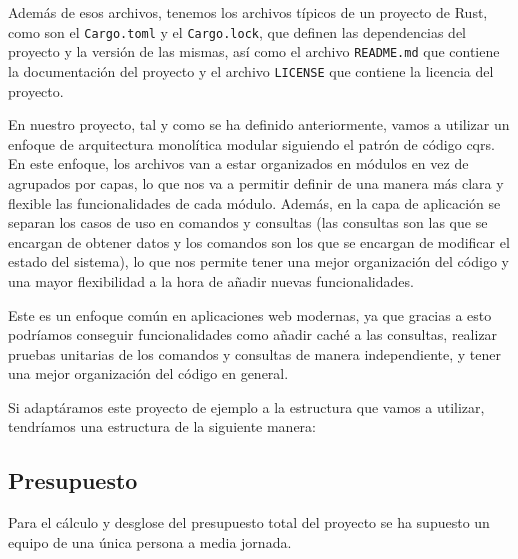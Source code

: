 Además de esos archivos, tenemos los archivos típicos de un proyecto de Rust, como son el \texttt{Cargo.toml} y el \texttt{Cargo.lock}, que definen las dependencias del proyecto y la versión de las mismas, así como el archivo \texttt{README.md} que contiene la documentación del proyecto y el archivo \texttt{LICENSE} que contiene la licencia del proyecto.

En nuestro proyecto, tal y como se ha definido anteriormente, vamos a utilizar un enfoque de arquitectura monolítica modular siguiendo el patrón de código \acrshort{cqrs}.
En este enfoque, los archivos van a estar organizados en módulos en vez de agrupados por capas, lo que nos va a permitir definir de una manera más clara y flexible las funcionalidades de cada módulo.
Además, en la capa de aplicación se separan los casos de uso en comandos y consultas (las consultas son las que se encargan de obtener datos y los comandos son los que se encargan de modificar el estado del sistema), lo que nos permite tener una mejor organización del código y una mayor flexibilidad a la hora de añadir nuevas funcionalidades.

Este es un enfoque común en aplicaciones web modernas, ya que gracias a esto podríamos conseguir funcionalidades como añadir caché a las consultas, realizar pruebas unitarias de los comandos y consultas de manera independiente, y tener una mejor organización del código en general.

Si adaptáramos este proyecto de ejemplo a la estructura que vamos a utilizar, tendríamos una estructura de la siguiente manera:

\newpage
{}

\subsection{Presupuesto}
Para el cálculo y desglose del presupuesto total del proyecto se ha supuesto un equipo de una única persona a media jornada.

